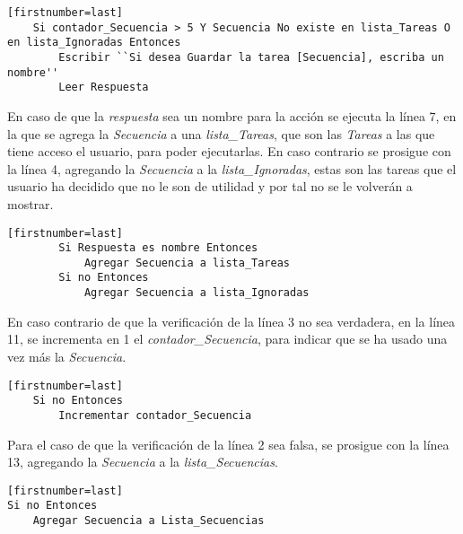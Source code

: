 \begin{tiny}
\begin{lstlisting}[name=EXseleccion][firstnumber=last]
    Si contador_Secuencia > 5 Y Secuencia No existe en lista_Tareas O en lista_Ignoradas Entonces
        Escribir ``Si desea Guardar la tarea [Secuencia], escriba un nombre''
        Leer Respuesta
\end{lstlisting}
\end{tiny}

En caso de que la \emph{respuesta} sea un nombre para la acci\'on se ejecuta 
 la l\'inea 7, en la que se agrega la \emph{Secuencia} a una 
 \emph{lista\_Tareas}, que son las \emph{Tareas} a las que tiene acceso el 
 usuario, para poder ejecutarlas. En caso contrario se prosigue con la 
 l\'inea 4, agregando la \emph{Secuencia} a la \emph{lista\_Ignoradas}, 
 estas son las tareas que el usuario ha decidido que no le son de utilidad y 
 por tal no se le volver\'an a mostrar.

\begin{tiny}
\begin{lstlisting}[name=EXseleccion][firstnumber=last]
        Si Respuesta es nombre Entonces
            Agregar Secuencia a lista_Tareas
        Si no Entonces 
            Agregar Secuencia a lista_Ignoradas
\end{lstlisting}
\end{tiny}

En caso contrario de que la verificaci\'on de la l\'inea 3 no sea verdadera, 
 en la l\'inea 11, se incrementa en 1 el \emph{contador\_Secuencia}, para 
 indicar que se ha usado una vez m\'as la \emph{Secuencia}.

\begin{tiny}
\begin{lstlisting}[name=EXseleccion][firstnumber=last]
    Si no Entonces
        Incrementar contador_Secuencia
\end{lstlisting}
\end{tiny}

Para el caso de que la verificaci\'on de la l\'inea 2 sea falsa, se prosigue 
 con la l\'inea 13, agregando la \emph{Secuencia} a la 
 \emph{lista\_Secuencias}.

\begin{tiny}
\begin{lstlisting}[name=EXseleccion][firstnumber=last]
Si no Entonces
    Agregar Secuencia a Lista_Secuencias
\end{lstlisting}
\end{tiny}

